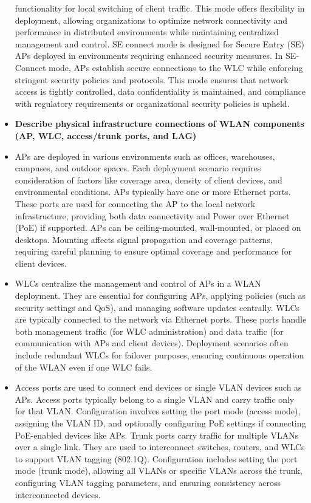 \documentclass{article}
\begin{document}
\begin{itemize}
functionality for local switching of client traffic. This mode offers flexibility in deployment, allowing organizations to optimize network connectivity and performance in distributed environments while maintaining centralized management and control. SE connect mode is designed for Secure Entry (SE) APs deployed in environments requiring enhanced security measures. In SE-Connect mode, APs establish secure connections to the WLC while enforcing stringent security policies and protocols. This mode ensures that network access is tightly controlled, data confidentiality is maintained, and compliance with regulatory requirements or organizational security policies is upheld.
  	
  \item \textbf{Describe physical infrastructure connections of WLAN components (AP, WLC, access/trunk ports, and LAG)}
  	\item[] APs are deployed in various environments such as offices, warehouses, campuses, and outdoor spaces. Each deployment scenario requires consideration of factors like coverage area, density of client devices, and environmental conditions. APs typically have one or more Ethernet ports. These ports are used for connecting the AP to the local network infrastructure, providing both data connectivity and Power over Ethernet (PoE) if supported. APs can be ceiling-mounted, wall-mounted, or placed on desktops. Mounting affects signal propagation and coverage patterns, requiring careful planning to ensure optimal coverage and performance for client devices.
	\item[] WLCs centralize the management and control of APs in a WLAN deployment. They are essential for configuring APs, applying policies (such as security settings and QoS), and managing software updates centrally. WLCs are typically connected to the network via Ethernet ports. These ports handle both management traffic (for WLC administration) and data traffic (for communication with APs and client devices). Deployment scenarios often include redundant WLCs for failover purposes, ensuring continuous operation of the WLAN even if one WLC fails.
	\item[] Access ports are used to connect end devices or single VLAN devices such as APs. Access ports typically belong to a single VLAN and carry traffic only for that VLAN. Configuration involves setting the port mode (access mode), assigning the VLAN ID, and optionally configuring PoE settings if connecting PoE-enabled devices like APs. Trunk ports carry traffic for multiple VLANs over a single link. They are used to interconnect switches, routers, and WLCs to support VLAN tagging (802.1Q). Configuration includes setting the port mode (trunk mode), allowing all VLANs or specific VLANs across the trunk, configuring VLAN tagging parameters, and ensuring consistency across interconnected devices.

\end{itemize}
\end{document}
